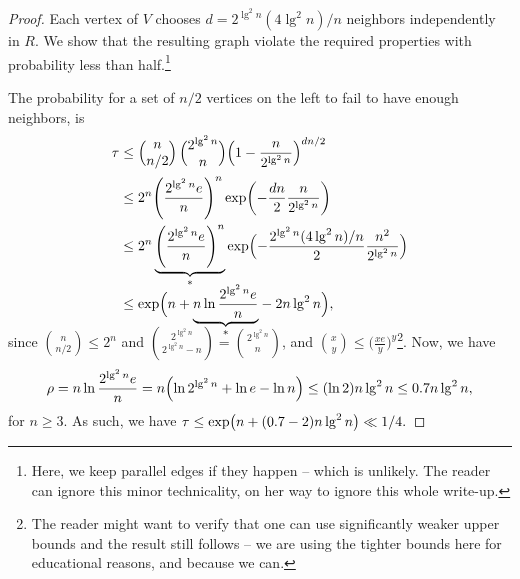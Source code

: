 \begin{proof}
    Each vertex of $V$ chooses
    $\displaystyle d= 2^{\lg^2n} ( 4 \lg^2 n)/n$ neighbors
    independently in $R$. We show that the resulting graph violate the
    required properties with probability less than
    half.\footnote{Here, we keep parallel edges if they happen --
       which is unlikely. The reader can ignore this minor
       technicality, on her way to ignore this whole write-up.}
    
    The probability for a set of $n/2$ vertices on the left to fail to
    have enough neighbors, is
    \begin{align*}
      \tau%
      & \leq %
        \mybinom{n}{n/2} \, \mybinom{2^{\lg^2 n}}{n} \pth{ 1 -
        \frac{n}{2^{\lg^2 n}}}^{dn/2}%
        \\&\leq %
        2^n \pth{\frac{2^{\lg^2 n}e}{n}}^n \exp \pth{ -
        \frac{dn}{2} \frac{n}{2^{\lg^2 n}}}%
      \\&%
      \leq%
      2^n \underbrace{\pth{\frac{2^{\lg^2 n}e}{n}}^n}_{*}%
      \exp \Bigl({ - \frac{ {2^{\lg^2n} ( 4 \lg^2 n)/n}}{2}
      \frac{n^2}{2^{\lg^2 n}}}\Bigr)%
      \\&\leq%
      \exp \pth{\Bigl. n +
      \smash{\underbrace{n \ln {\frac{2^{\lg^2 n}e}{n}}}_{*}}
      - 2n \lg^2 n },
    \end{align*}
    since $\binom{n}{n/2} \leq 2^n$ and
    $\binom{2^{\lg^2 n}}{2^{\lg^2 n} - n} = \binom{2^{\lg^2 n}}{n}$,
    and $\binom{x}{y} \leq \bigl(\frac{xe}{y}\bigr)^y$\footnote{The
       reader might want to verify that one can use significantly
       weaker upper bounds and the result still follows -- we are
       using the tighter bounds here for educational reasons, and
       because we can.}. %
    Now, we have
    \begin{equation*}
      \rho%
      =%
      n \ln {\frac{2^{\lg^2 n}e}{n}}%
      =%
      n \pth{ \ln 2^{\lg^2 n} + \ln e - \ln n}%
      \leq
      (\ln 2 ) n \lg^2 n%
      \leq
      0.7 n \lg^2 n,        
  \end{equation*}
    for $n \geq 3$. As such, we have
    \begin{math}
        \tau \leq \exp \pth{ n + (0.7-2) n \lg^2 n}%
        \ll 1/4.
    \end{math}


\end{proof}
